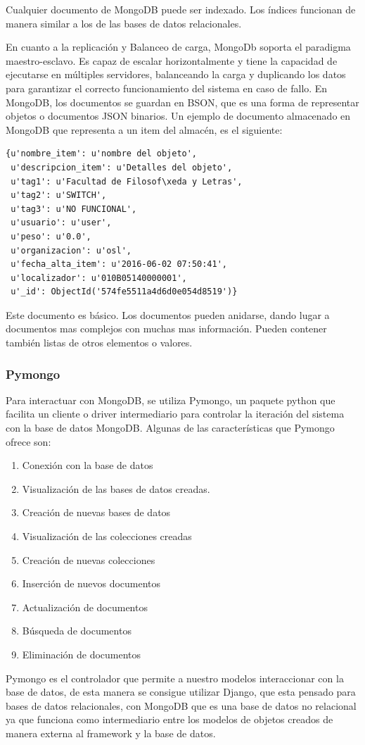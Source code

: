 \documentclass[a4paper,11pt]{book}
\begin{document}
Cualquier documento de MongoDB puede ser indexado. Los índices funcionan de manera similar a los de las bases de datos relacionales. 

En cuanto a la replicación y Balanceo de carga, MongoDb soporta el paradigma maestro-esclavo. Es capaz de escalar horizontalmente y tiene la capacidad de ejecutarse en múltiples servidores, balanceando la carga y duplicando los datos para garantizar el correcto funcionamiento del sistema en caso de fallo. 
En MongoDB, los documentos se guardan en BSON, que es una forma de representar objetos o documentos JSON binarios. Un ejemplo de documento almacenado en MongoDB que representa a un item del almacén, es el siguiente:
\begin{lstlisting}
{u'nombre_item': u'nombre del objeto', 
 u'descripcion_item': u'Detalles del objeto', 
 u'tag1': u'Facultad de Filosof\xeda y Letras',
 u'tag2': u'SWITCH',
 u'tag3': u'NO FUNCIONAL',
 u'usuario': u'user',
 u'peso': u'0.0',
 u'organizacion': u'osl',
 u'fecha_alta_item': u'2016-06-02 07:50:41',
 u'localizador': u'010B05140000001',
 u'_id': ObjectId('574fe5511a4d6d0e054d8519')}
\end{lstlisting}
Este documento es básico. Los documentos pueden anidarse, dando lugar a documentos mas complejos con muchas mas información. Pueden contener también listas de otros elementos o valores. 
\subsubsection{Pymongo} 
Para interactuar con MongoDB, se utiliza Pymongo\cite{pymongo}, un paquete python que facilita un cliente o driver intermediario para controlar la iteración del sistema con la base de datos MongoDB. Algunas de las características que Pymongo ofrece son:
\begin{enumerate}
\item Conexión con la base de datos
\item Visualización de las bases de datos creadas.
\item Creación de nuevas bases de datos
\item Visualización de las colecciones creadas
\item Creación de nuevas colecciones
\item Inserción de nuevos documentos
\item Actualización de documentos
\item Búsqueda de documentos
\item Eliminación de documentos
\end{enumerate}
Pymongo es el controlador que permite a nuestro modelos interaccionar con la base de datos, de esta manera se consigue utilizar Django, que esta pensado para bases de datos relacionales, con MongoDB que es una base de datos no relacional ya que funciona como intermediario entre los modelos de objetos creados de manera externa al framework y la base de datos.
\end{document}
